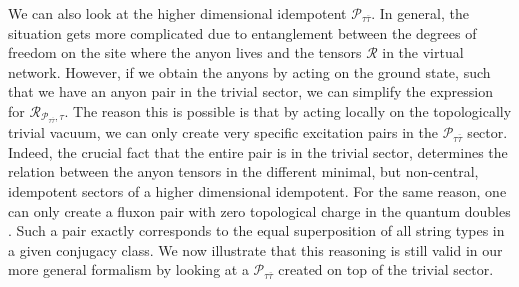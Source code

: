 \documentclass[12 pt]{article}
\begin{document}
We can also look at the higher dimensional idempotent $\mathcal{P}_{\tau\overline{\tau}}$. In general, the situation gets more complicated due to entanglement between the degrees of freedom on the site where the anyon lives and the  tensors $\mathcal{R}$ in the virtual network. However, if we obtain the anyons by acting on the ground state, such that we have an anyon pair in the trivial sector, we can simplify the expression for $\mathcal{R}_{\mathcal{P}_{\tau\overline{\tau}},\tau}$. The reason this is possible is that by acting locally on the topologically trivial vacuum, we can only create very specific excitation pairs in the $\mathcal{P}_{\tau\overline{\tau}}$ sector. Indeed, the crucial fact that the entire pair is in the trivial sector, determines the relation between the anyon tensors in the different minimal, but non-central, idempotent sectors of a higher dimensional idempotent. For the same reason, one can only create a fluxon pair with zero topological charge in the quantum doubles \cite{Ginjectivity,toriccode,preskill1999lecture}. Such a pair exactly corresponds to the equal superposition of all string types in a given conjugacy class. We now illustrate that this reasoning is still valid in our more general formalism by looking at a $\mathcal{P}_{\tau\overline{\tau}}$ created on top of the trivial sector.



\clearpage



\end{document}
